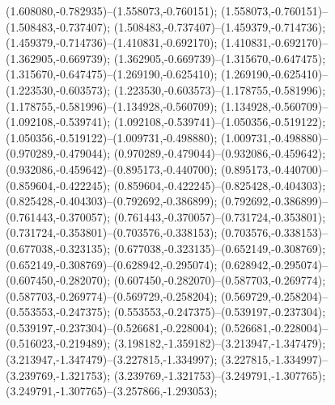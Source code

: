  (1.608080,-0.782935)--(1.558073,-0.760151);
 (1.558073,-0.760151)--(1.508483,-0.737407);
 (1.508483,-0.737407)--(1.459379,-0.714736);
 (1.459379,-0.714736)--(1.410831,-0.692170);
 (1.410831,-0.692170)--(1.362905,-0.669739);
 (1.362905,-0.669739)--(1.315670,-0.647475);
 (1.315670,-0.647475)--(1.269190,-0.625410);
 (1.269190,-0.625410)--(1.223530,-0.603573);
 (1.223530,-0.603573)--(1.178755,-0.581996);
 (1.178755,-0.581996)--(1.134928,-0.560709);
 (1.134928,-0.560709)--(1.092108,-0.539741);
 (1.092108,-0.539741)--(1.050356,-0.519122);
 (1.050356,-0.519122)--(1.009731,-0.498880);
 (1.009731,-0.498880)--(0.970289,-0.479044);
 (0.970289,-0.479044)--(0.932086,-0.459642);
 (0.932086,-0.459642)--(0.895173,-0.440700);
 (0.895173,-0.440700)--(0.859604,-0.422245);
 (0.859604,-0.422245)--(0.825428,-0.404303);
 (0.825428,-0.404303)--(0.792692,-0.386899);
 (0.792692,-0.386899)--(0.761443,-0.370057);
 (0.761443,-0.370057)--(0.731724,-0.353801);
 (0.731724,-0.353801)--(0.703576,-0.338153);
 (0.703576,-0.338153)--(0.677038,-0.323135);
 (0.677038,-0.323135)--(0.652149,-0.308769);
 (0.652149,-0.308769)--(0.628942,-0.295074);
 (0.628942,-0.295074)--(0.607450,-0.282070);
 (0.607450,-0.282070)--(0.587703,-0.269774);
 (0.587703,-0.269774)--(0.569729,-0.258204);
 (0.569729,-0.258204)--(0.553553,-0.247375);
 (0.553553,-0.247375)--(0.539197,-0.237304);
 (0.539197,-0.237304)--(0.526681,-0.228004);
 (0.526681,-0.228004)--(0.516023,-0.219489);
 (3.198182,-1.359182)--(3.213947,-1.347479);
 (3.213947,-1.347479)--(3.227815,-1.334997);
 (3.227815,-1.334997)--(3.239769,-1.321753);
 (3.239769,-1.321753)--(3.249791,-1.307765);
 (3.249791,-1.307765)--(3.257866,-1.293053);
